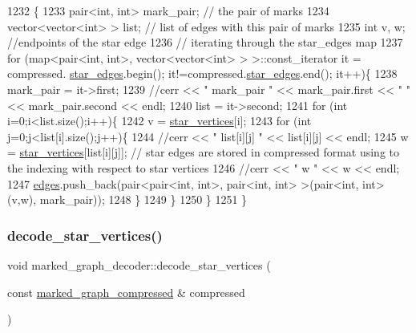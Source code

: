 \begin{DoxyCode}
1232 \{
1233   pair<int, int> mark\_pair; \textcolor{comment}{// the pair of marks}
1234   vector<vector<int> > list; \textcolor{comment}{// list of edges with this pair of marks}
1235   \textcolor{keywordtype}{int} v, w; \textcolor{comment}{//endpoints of the star edge}
1236   \textcolor{comment}{// iterating through the star\_edges map}
1237   \textcolor{keywordflow}{for} (map<pair<int, int>, vector<vector<int> > >::const\_iterator it = compressed.
      \hyperlink{classmarked__graph__compressed_a7df5779d313486644132bd816937f532}{star\_edges}.begin(); it!=compressed.\hyperlink{classmarked__graph__compressed_a7df5779d313486644132bd816937f532}{star\_edges}.end(); it++)\{
1238     mark\_pair = it->first;
1239     \textcolor{comment}{//cerr << " mark\_pair " << mark\_pair.first << " " << mark\_pair.second << endl;}
1240     list = it->second;
1241     \textcolor{keywordflow}{for} (\textcolor{keywordtype}{int} i=0;i<list.size();i++)\{
1242       v = \hyperlink{classmarked__graph__decoder_a06fc05827db14b675f7ecc2fd915b533}{star\_vertices}[i];
1243       \textcolor{keywordflow}{for} (\textcolor{keywordtype}{int} j=0;j<list[i].size();j++)\{
1244         \textcolor{comment}{//cerr << " list[i][j] " << list[i][j] << endl;}
1245         w = \hyperlink{classmarked__graph__decoder_a06fc05827db14b675f7ecc2fd915b533}{star\_vertices}[list[i][j]]; \textcolor{comment}{// star edges are stored in compressed format using to
       the indexing with respect to star vertices}
1246         \textcolor{comment}{//cerr << " w " << w << endl;}
1247         \hyperlink{classmarked__graph__decoder_af9e75da0a495d9c3bdcd169e15e3261e}{edges}.push\_back(pair<pair<int, int>, pair<int, int> >(pair<int, int>(v,w), mark\_pair));
1248       \}
1249     \}
1250   \}
1251 \}
\end{DoxyCode}
\mbox{\label{classmarked__graph__decoder_a57fba34d119743414a38c7339b910d99}} 
\subsubsection{\texorpdfstring{decode\+\_\+star\+\_\+vertices()}{decode\_star\_vertices()}}
{\footnotesize\ttfamily void marked\+\_\+graph\+\_\+decoder\+::decode\+\_\+star\+\_\+vertices (\begin{DoxyParamCaption}\item[{const \hyperlink{classmarked__graph__compressed}{marked\+\_\+graph\+\_\+compressed} \&}]{compressed }\end{DoxyParamCaption})\hspace{0.3cm}{\ttfamily [private]}}


